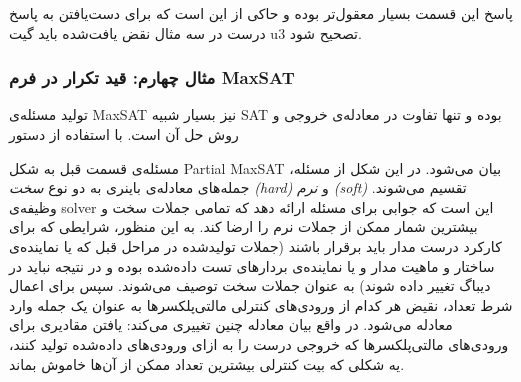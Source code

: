 \documentclass{article}
\begin{document}

پاسخ این قسمت بسیار معقول‌تر بوده و حاکی از این است که برای دست‌یافتن به پاسخ درست در سه مثال نقض یافت‌شده باید گیت u3 تصحیح شود. 

\subsubsection{مثال چهارم: قید تکرار در فرم MaxSAT}\label{section:maxsat}

تولید مسئله‌ی MaxSAT نیز بسیار شبیه SAT بوده و تنها تفاوت در معادله‌ی خروجی و روش حل آن است. با استفاده از دستور 

\begin{flushleft}
\end{flushleft}

مسئله‌ی قسمت قبل به شکل Partial MaxSAT بیان می‌شود. در این شکل از مسئله، جمله‌های معادله‌ی باینری به دو نوع \textit{سخت (hard)} و \textit{نرم (soft)} تقسیم می‌شوند. وظیفه‌ی solver این است که جوابی برای مسئله ارائه دهد که تمامی جملات سخت و بیشترین شمار ممکن از جملات نرم را ارضا کند. به این منظور، شرایطی که برای کارکرد درست مدار باید برقرار باشند (جملات تولیدشده در مراحل قبل که یا نماینده‌ی ساختار و ماهیت مدار و یا نماینده‌ی بردارهای تست داده‌شده بوده و در نتیجه نباید در دیباگ تغییر داده شوند) به عنوان جملات سخت توصیف می‌شوند. سپس برای اعمال شرط تعداد، نقیض هر کدام از ورودی‌های کنترلی مالتی‌پلکسرها به عنوان یک جمله وارد معادله می‌شود. در واقع بیان معادله چنین تغییری می‌کند: یافتن مقادیری برای ورودی‌های مالتی‌پلکسرها که خروجی درست را به ازای ورودی‌های داده‌شده تولید کنند، یه شکلی که بیت کنترلی بیشترین تعداد ممکن از آن‌ها خاموش بماند. 
\end{document}

